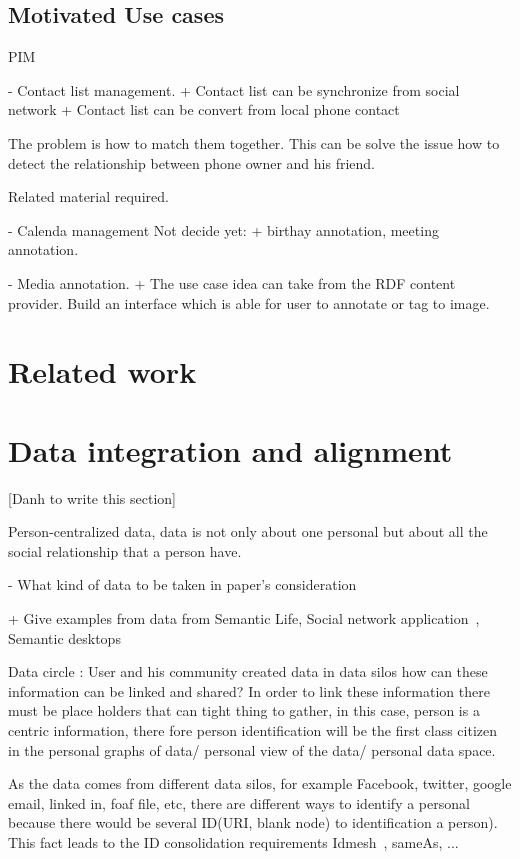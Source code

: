 \documentclass[runningheads,a4paper]{llncs}
\begin{document}
\subsection{Motivated Use cases}
 PIM 
 


 - Contact list management. 
    + Contact list can be synchronize from social network
    + Contact list can be convert from local phone contact

 The problem is how to match them together. This can be solve the issue how to detect the relationship between phone owner and his friend.

Related material required.
 
 - Calenda management
 Not decide yet:
  + birthay annotation, meeting annotation.

 - Media annotation. 
  + The use case idea can take from the RDF content provider. Build an interface which is able for user to annotate or tag to image.




\section{Related work}

\section{Data integration and alignment}

[Danh to write this section]

Person-centralized data, data is not only about one personal but about all the social relationship that a person have.

- What kind of data to be taken in paper's consideration

	+ Give examples from data from Semantic Life, Social network application~\cite{Tramp:2010}, Semantic desktops

Data circle : User and his community created data in data silos how can these information can be linked and shared? 
In order to link these information there must be place holders that can tight thing to gather, in this case, person is a centric information,
there fore person identification will be the first class citizen in the personal graphs of data/ personal view of the data/ personal data space. 

As the data comes from different data silos, for example Facebook, twitter, google email, linked in, foaf file, etc, there are different ways to identify 
a personal because there would be several ID(URI, blank node) to identification a person). This fact leads to the  
ID consolidation requirements  Idmesh~\cite{Cudre-Mauroux:2009}, sameAs, ...
\end{document}
